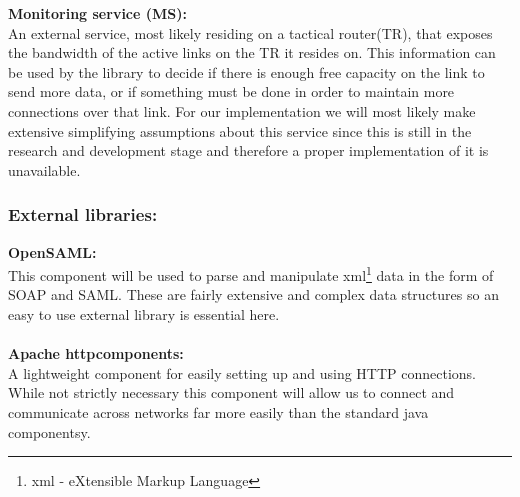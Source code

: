 \indent \textbf{Monitoring service (MS):}\\
An external service, most likely residing on a tactical router(TR), that exposes the bandwidth of the active links on the TR it resides on. This information can be used by the library to decide if there is enough free capacity on the link to send more data, or if something must be done in order to maintain more connections over that link. For our implementation we will most likely make extensive simplifying assumptions about this service since this is still in the research and development stage and therefore a proper implementation of it is unavailable. 

    \subsubsection{External libraries:}
\indent \indent \textbf{OpenSAML:}\\
This component will be used to parse and manipulate \gls{xml}\footnote{\gls{xml} - eXtensible Markup Language} data in the form of SOAP and SAML. These are fairly extensive and complex data structures so an easy to use external library is essential here.
\\\\

\indent \textbf{Apache \gls{httpcomponents}:}\\
A lightweight component for easily setting up and using HTTP connections. While not strictly necessary this component will allow us to connect and communicate across networks far more easily than the standard java componentsy.

